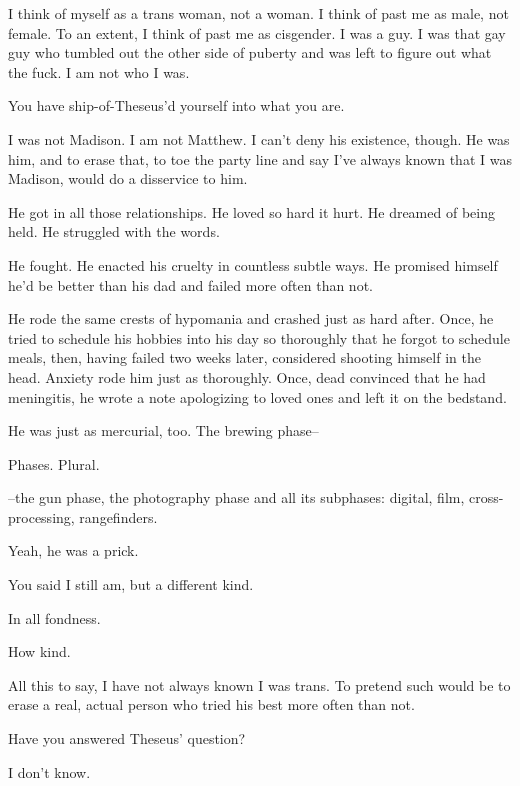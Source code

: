 \begin{paracol}{2}
  \begin{leftcolumn}

\noindent I think of myself as a trans woman, not a woman. I think of past me as male, not female. To an extent, I think of past me as cisgender. I was a guy. I was that gay guy who tumbled out the other side of puberty and was left to figure out what the fuck. I am not who I was.

\begin{ally}
You have ship-of-Theseus'd yourself into what you are.
\end{ally}
I was not Madison. I am not Matthew. I can't deny his existence, though. He was him, and to erase that, to toe the party line and say I've always known that I was Madison, would do a disservice to him.

He got in all those relationships. He loved so hard it hurt. He dreamed of being held. He struggled with the words.

He fought. He enacted his cruelty in countless subtle ways. He promised himself he'd be better than his dad and failed more often than not.

He rode the same crests of hypomania and crashed just as hard after. Once, he tried to schedule his hobbies into his day so thoroughly that he forgot to schedule meals, then, having failed two weeks later, considered shooting himself in the head. Anxiety rode him just as thoroughly. Once, dead convinced that he had meningitis, he wrote a note apologizing to loved ones and left it on the bedstand.

He was just as mercurial, too. The brewing phase--

\begin{ally}
Phases. Plural.
\end{ally}
--the gun phase, the photography phase and all its subphases: digital, film, cross-processing, rangefinders.

\begin{ally}
Yeah, he was a prick.
\end{ally}
You said I still am, but a different kind.

\begin{ally}
In all fondness.
\end{ally}
How kind.

All this to say, I have not always known I was trans. To pretend such would be to erase a real, actual person who tried his best more often than not.

\begin{ally}
Have you answered Theseus' question?
\end{ally}
I don't know.

\newpage
\end{leftcolumn}
\end{paracol}
